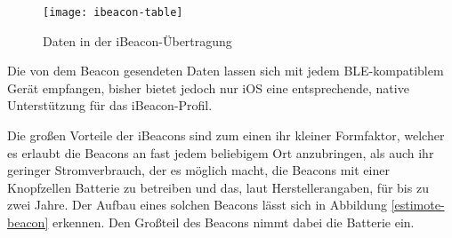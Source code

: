 \begin{figure}[htb!]
		\centering
	\texttt{[image: ibeacon-table]}
	\caption{Daten in der iBeacon-Übertragung}
	\label{ibeacon-table}
\end{figure}


Die von dem Beacon gesendeten Daten lassen sich mit jedem BLE-kompatiblem Gerät empfangen, bisher bietet jedoch nur iOS eine entsprechende, native Unterstützung für das iBeacon-Profil.

Die großen Vorteile der iBeacons sind zum einen ihr kleiner Formfaktor, welcher es erlaubt die Beacons an fast jedem beliebigem Ort anzubringen, als auch ihr geringer Stromverbrauch, der es möglich macht, die Beacons mit einer Knopfzellen Batterie zu betreiben und das, laut Herstellerangaben, für bis zu zwei Jahre.
Der Aufbau eines solchen Beacons lässt sich in Abbildung \ref{estimote-beacon} erkennen. Den Großteil des Beacons nimmt dabei die Batterie ein. 


